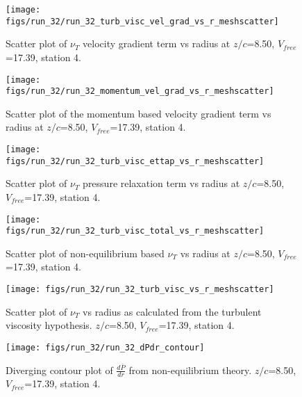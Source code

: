 \begin{figure}[H]
\centering
\texttt{[image: figs/run\_32/run\_32\_turb\_visc\_vel\_grad\_vs\_r\_meshscatter]}
\caption{Scatter plot of $\nu_T$ velocity gradient term vs radius at $z/c$=8.50, $V_{free}$=17.39, station 4.}
\end{figure}


\begin{figure}[H]
\centering
\texttt{[image: figs/run\_32/run\_32\_momentum\_vel\_grad\_vs\_r\_meshscatter]}
\caption{Scatter plot of the momentum based velocity gradient term vs radius at $z/c$=8.50, $V_{free}$=17.39, station 4.}
\end{figure}


\begin{figure}[H]
\centering
\texttt{[image: figs/run\_32/run\_32\_turb\_visc\_ettap\_vs\_r\_meshscatter]}
\caption{Scatter plot of $\nu_T$ pressure relaxation term vs radius at $z/c$=8.50, $V_{free}$=17.39, station 4.}
\end{figure}


\begin{figure}[H]
\centering
\texttt{[image: figs/run\_32/run\_32\_turb\_visc\_total\_vs\_r\_meshscatter]}
\caption{Scatter plot of non-equilibrium based $\nu_T$ vs radius at $z/c$=8.50, $V_{free}$=17.39, station 4.}
\end{figure}


\begin{figure}[H]
\centering
\texttt{[image: figs/run\_32/run\_32\_turb\_visc\_vs\_r\_meshscatter]}
\caption{Scatter plot of $\nu_T$ vs radius as calculated from the turbulent viscosity hypothesis. $z/c$=8.50, $V_{free}$=17.39, station 4.}
\end{figure}


\begin{figure}[H]
\centering
\texttt{[image: figs/run\_32/run\_32\_dPdr\_contour]}
\caption{Diverging contour plot of $\frac{d\bar{P}}{dr}$ from non-equilibrium theory. $z/c$=8.50, $V_{free}$=17.39, station 4.}
\end{figure}


